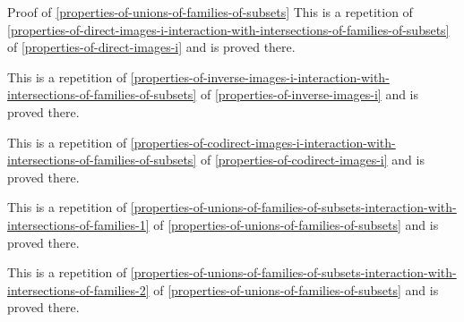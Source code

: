 \begin{Proof}{Proof of \cref{properties-of-unions-of-families-of-subsets}}
    This is a repetition of \cref{properties-of-direct-images-i-interaction-with-intersections-of-families-of-subsets} of \cref{properties-of-direct-images-i} and is proved there.

    This is a repetition of \cref{properties-of-inverse-images-i-interaction-with-intersections-of-families-of-subsets} of \cref{properties-of-inverse-images-i} and is proved there.

    This is a repetition of \cref{properties-of-codirect-images-i-interaction-with-intersections-of-families-of-subsets} of \cref{properties-of-codirect-images-i} and is proved there.

    This is a repetition of \cref{properties-of-unions-of-families-of-subsets-interaction-with-intersections-of-families-1} of \cref{properties-of-unions-of-families-of-subsets} and is proved there.

    This is a repetition of \cref{properties-of-unions-of-families-of-subsets-interaction-with-intersections-of-families-2} of \cref{properties-of-unions-of-families-of-subsets} and is proved there.
\end{Proof}
